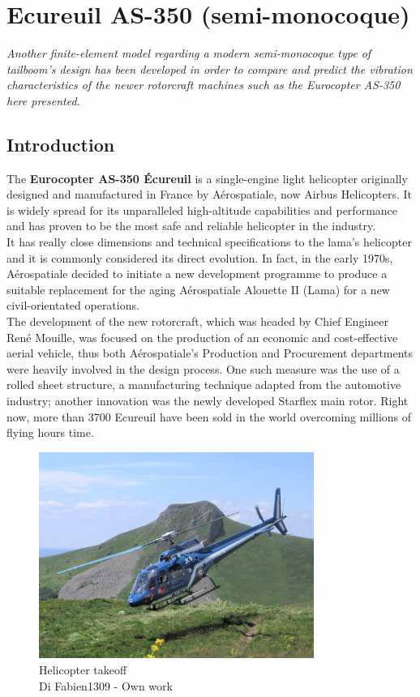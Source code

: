 \chapter{Ecureuil AS-350 (semi-monocoque)}
\label{ch:Eurocopter AS350 (monocoque frame)}

\noindent
\emph{Another finite-element model regarding a modern semi-monocoque type of tailboom's design has been developed in order to compare and predict the vibration characteristics of the newer rotorcraft machines such as the Eurocopter AS-350 here presented.}

\section*{Introduction}
\noindent
The \textbf{Eurocopter AS-350 Écureuil} is a single-engine light helicopter originally designed and manufactured in France by Aérospatiale, now Airbus Helicopters. It is widely spread for its unparalleled high-altitude capabilities and performance and has proven to be the most safe and reliable helicopter in the industry. \\
It has really close dimensions and technical specifications to the lama's helicopter and it is commonly considered its direct evolution. In fact, in the early 1970s, Aérospatiale decided to initiate a new development programme to produce a suitable replacement for the aging Aérospatiale Alouette II (Lama) for a new civil-orientated operations. \\
The development of the new rotorcraft, which was headed by Chief Engineer René Mouille, was focused on the production of an economic and cost-effective aerial vehicle, thus both Aérospatiale's Production and Procurement departments were heavily involved in the design process.
One such measure was the use of a rolled sheet structure, a manufacturing technique adapted from the automotive industry; another innovation was the newly developed Starflex main rotor. Right now, more than 3700 Ecureuil have been sold in the world overcoming millions of flying hours time.

\begin{figure}[t]
\centering
\includegraphics[width=0.80\textwidth]{imgs/Helicopter_rescue_sancy_takeoff}
\caption{Helicopter takeoff \\Di Fabien1309 - Own work}
\label{fig:AS350wiki}
\end{figure}

